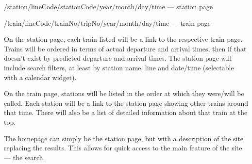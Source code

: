 \documentclass[a4paper,12pt,twoside]{report}
\begin{document}
/station/lineCode/stationCode/year/month/day/time --- station page

/train/lineCode/trainNo/tripNo/year/month/day/time --- train page

On the station page, each train listed will be a link to the respective train
page. Trains will be ordered in terms of actual departure and arrival times,
then if that doesn't exist by predicted departure and arrival times. The
station page will include search filters, at least by station name, line and
date/time (selectable with a calendar widget).

On the train page, stations will be listed in the order at which they were/will
be called. Each station will be a link to the station page showing other trains
around that time. There will also be a list of detailed information about that
train at the top.

The homepage can simply be the station page, but with a description of the site
replacing the results. This allows for quick access to the main feature of the
site --- the search.
\end{document}

